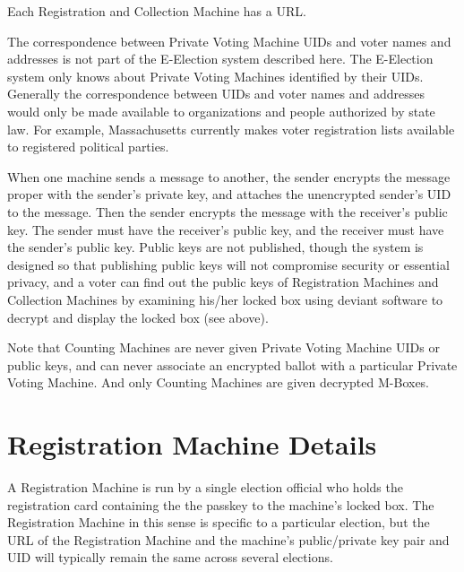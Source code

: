 \documentclass[12pt]{article}
\begin{document}
Each Registration and Collection Machine has a URL.

The correspondence between Private Voting Machine UIDs
and voter names and addresses is not part of the E-Election system
described here.  The E-Election system only knows about
Private Voting Machines identified by their UIDs.
Generally the correspondence between UIDs and voter names and addresses
would only be made available
to organizations and people authorized by state law.
For example, Massachusetts currently makes voter registration lists
available to registered political parties.

When one machine sends a message to another, the sender
encrypts the message proper with the sender's private
key, and attaches the unencrypted sender's UID to the
message.  Then the sender encrypts the message with the
receiver's public key.  The sender must have the receiver's
public key, and the receiver must have the sender's public
key.  Public keys are not published,
though the system is designed so that publishing public
keys will not compromise security or essential privacy,
and a voter can find out the public keys of Registration
Machines and Collection Machines by examining his/her locked
box using deviant software to decrypt and
display the locked box (see \pageref{DEVIANT-SOFTWARE} above).

Note that Counting Machines are never given Private Voting
Machine UIDs or public keys, and can never associate an
encrypted ballot with a particular Private Voting Machine.
And only Counting Machines are given decrypted M-Boxes.

\section{Registration Machine Details}

A Registration Machine is run by a single election official
who holds the registration card containing the the passkey to
the machine's locked box.  The Registration Machine in this
sense is specific to a particular election, but the
URL of the Registration Machine and the machine's
public/private key pair and UID will typically remain the same across
several elections.
\end{document}
